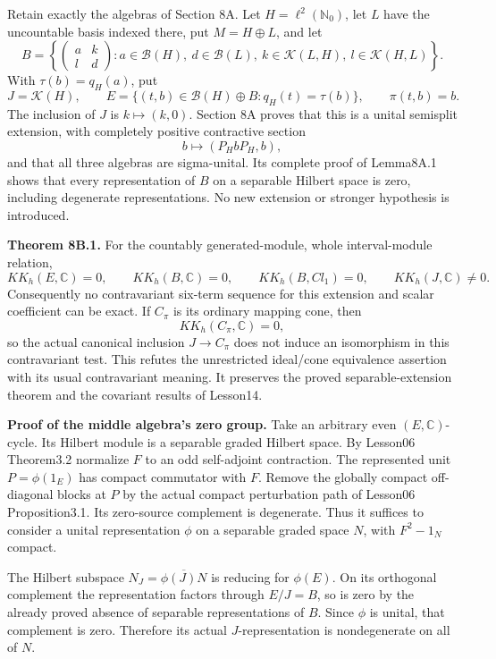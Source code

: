 \documentclass[
  11pt,
]{article}
\begin{document}
Retain exactly the algebras of Section 8A. Let
\(H=\ell^2(\mathbb N_0)\), let \(L\) have the uncountable basis indexed
there, put \(M=H\oplus L\), and let \[
 B=\left\{\begin{pmatrix}a&k\\l&d\end{pmatrix}:
 a\in\mathcal B(H),\ d\in\mathcal B(L),\
 k\in\mathcal K(L,H),\ l\in\mathcal K(H,L)\right\}.
\] With \(\tau(b)=q_H(a)\), put \[
 J=\mathcal K(H),\qquad
 E=\{(t,b)\in\mathcal B(H)\oplus B:q_H(t)=\tau(b)\},\qquad
 \pi(t,b)=b .
 \tag{CC.1}
\] The inclusion of \(J\) is \(k\mapsto(k,0)\). Section 8A proves that
this is a unital semisplit extension, with completely positive
contractive section \[
 b\longmapsto(P_HbP_H,b),
\] and that all three algebras are sigma-unital. Its complete proof of
Lemma8A.1 shows that every representation of \(B\) on a separable
Hilbert space is zero, including degenerate representations. No new
extension or stronger hypothesis is introduced.

\textbf{Theorem 8B.1.} For the countably generated-module, whole
interval-module relation, \[
 KK_h(E,\mathbb C)=0,\qquad KK_h(B,\mathbb C)=0,\qquad
 KK_h(B,Cl_1)=0,\qquad KK_h(J,\mathbb C)\ne0 .
 \tag{CC.2}
\] Consequently no contravariant six-term sequence for this extension
and scalar coefficient can be exact. If \(C_\pi\) is its ordinary
mapping cone, then \[
 KK_h(C_\pi,\mathbb C)=0,
 \tag{CC.3}
\] so the actual canonical inclusion \(J\to C_\pi\) does not induce an
isomorphism in this contravariant test. This refutes the unrestricted
ideal/cone equivalence assertion with its usual contravariant meaning.
It preserves the proved separable-extension theorem and the covariant
results of Lesson14.

\textbf{Proof of the middle algebra's zero group.} Take an arbitrary
even \((E,\mathbb C)\)-cycle. Its Hilbert module is a separable graded
Hilbert space. By Lesson06 Theorem3.2 normalize \(F\) to an odd
self-adjoint contraction. The represented unit \(P=\phi(1_E)\) has
compact commutator with \(F\). Remove the globally compact off-diagonal
blocks at \(P\) by the actual compact perturbation path of Lesson06
Proposition3.1. Its zero-source complement is degenerate. Thus it
suffices to consider a unital representation \(\phi\) on a separable
graded space \(N\), with \(F^2-1_N\) compact.

The Hilbert subspace \(N_J=\overline{\phi(J)N}\) is reducing for
\(\phi(E)\). On its orthogonal complement the representation factors
through \(E/J=B\), so is zero by the already proved absence of separable
representations of \(B\). Since \(\phi\) is unital, that complement is
zero. Therefore its actual \(J\)-representation is nondegenerate on all
of \(N\).
\end{document}
